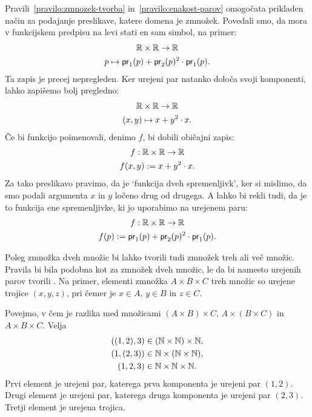 Pravili~\ref{pravilo:zmnozek-tvorba} in~\ref{pravilo:enakost-parov} omogočata prikladen način za podajanje preslikave, katere domena je zmnožek. Povedali smo, da mora v funkcijskem predpisu na levi stati en sam simbol, na primer:
%
\begin{gather*}
  \RR \times \RR \to \RR \\
  p \mapsto \fst(p) + \snd(p)^2 \cdot \fst(p).
\end{gather*}
%
Ta zapis je precej nepregleden. Ker urejeni par natanko določa svoji komponenti, lahko zapišemo bolj pregledno:
%
\begin{gather*}
  \mathbb{R} \times \mathbb{R} \to \mathbb{R} \\
  (x, y) \mapsto x + y^2 \cdot x.
\end{gather*}
%
Če bi funkcijo poimenovali, denimo $f$, bi dobili običajni zapis:
%
\begin{gather*}
  f : \mathbb{R} \times \mathbb{R} \to \mathbb{R} \\
  f(x, y) \mathrel{{:}{=}} x + y^2 \cdot x.
\end{gather*}
%
Za tako preslikavo pravimo, da je `funkcija dveh spremenljivk', ker si mislimo, da smo
podali argumenta $x$ in $y$ ločeno drug od drugega. A lahko bi rekli tudi, da je to funkcija
ene spremenljivke, ki jo uporabimo na urejenem paru:
%
\begin{gather*}
  f : \RR \times \RR \to \RR \\
  f(p) \defeq \fst(p) + \snd(p)^2 \cdot \fst(p).
\end{gather*}


Poleg zmnožka dveh množic bi lahko tvorili tudi zmnožek treh ali več množic. Pravila bi bila podobna kot za zmnožek dveh
množic, le da bi namesto urejenih parov tvorili . Na primer, elementi zmnožka
$A \times B \times C$ treh množic so urejene trojice $(x, y, z)$, pri čemer je $x \in A$, $y \in B$ in $z \in C$.

\begin{zgled}
  Povejmo, v čem je razlika med množicami $(A \times B) \times C$, $A \times (B \times C)$ in $A \times B \times C$.
  Velja
  \begin{align*}
    ((1, 2), 3) &\in (\mathbb{N} \times \mathbb{N}) \times \mathbb{N}, \\
    (1, (2, 3)) &\in \mathbb{N} \times (\mathbb{N} \times \mathbb{N}), \\
    (1, 2, 3) &\in \mathbb{N} \times \mathbb{N} \times \mathbb{N}.
  \end{align*}
  Prvi element je urejeni par, katerega prva komponenta je urejeni par $(1, 2)$.
  Drugi element je urejeni par, katerega druga komponenta je urejeni par $(2, 3)$.
  Tretji element je urejena trojica.
\end{zgled}


